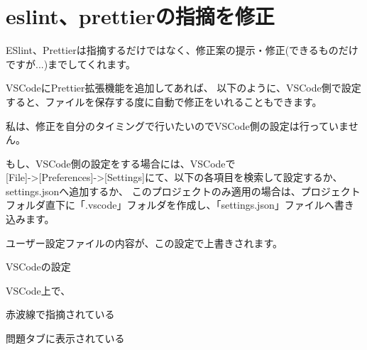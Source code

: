 \section{eslint、prettierの指摘を修正}
\keeplastskip{
  \label{sec:2-4}
  \label{sec-04fix}
  \par\nobreak
}

ESlint、Prettierは指摘するだけではなく、修正案の提示・修正(できるものだけですが...)までしてくれます。

\vspace*{\baselineskip}

VSCodeにPrettier拡張機能を追加してあれば、
以下のように、VSCode側で設定すると、ファイルを保存する度に自動で修正をいれることもできます。

\vspace*{\baselineskip}

私は、修正を自分のタイミングで行いたいのでVSCode側の設定は行っていません。

\vspace*{\baselineskip}

もし、VSCode側の設定をする場合には、VSCodeで\\[0pt]
[File]{-}\textgreater{}[Preferences]{-}\textgreater{}[Settings]にて、以下の各項目を検索して設定するか、settings.jsonへ追加するか、
このプロジェクトのみ適用の場合は、プロジェクトフォルダ直下に「.vscode」フォルダを作成し、「settings.json」ファイルへ書き込みます。

ユーザー設定ファイルの内容が、この設定で上書きされます。

\def\startercodeblockfontsize{}
\begin{starterprogram}[]{VSCodeの設定}\end{starterprogram}

VSCode上で、\\[0pt]

\begin{starteritemize}
\item 赤波線で指摘されている
\item 問題タブに表示されている
\end{starteritemize}

